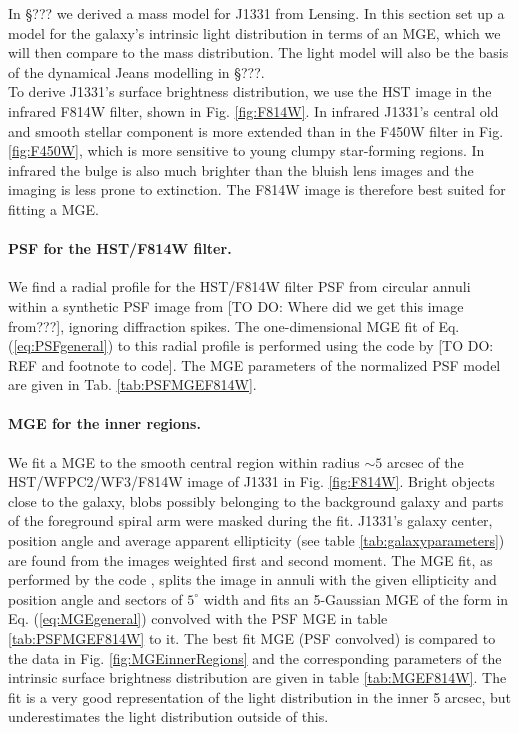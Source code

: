 
In \S ??? we derived a mass model for J1331 from Lensing. In this section set up a model for the galaxy's intrinsic light distribution in terms of an MGE, which we will then compare to the mass distribution. The light model will also be the basis of the dynamical Jeans modelling in \S ???.
\\To derive J1331's surface brightness distribution, we use the HST image in the infrared F814W filter, shown in Fig. \ref{fig:F814W}. In infrared J1331's central old and smooth stellar component is more extended than in the F450W filter in Fig. \ref{fig:F450W}, which is more sensitive to young clumpy star-forming regions. In infrared the bulge is also much brighter than the bluish lens images and the imaging is less prone to extinction. The F814W image is therefore best suited for fitting a MGE. 

\paragraph{PSF for the HST/F814W filter.} We find a radial profile for the HST/F814W filter PSF from circular annuli within a synthetic PSF image from [TO DO: Where did we get this image from???], ignoring diffraction spikes. The one-dimensional MGE fit of Eq. (\ref{eq:PSFgeneral}) to this radial profile is performed using the code by [TO DO: REF and footnote to code]. The MGE parameters of the normalized PSF model are given in Tab. \ref{tab:PSFMGEF814W}.

\paragraph{MGE for the inner regions.} We fit a MGE to the smooth central region within radius $\sim 5$ arcsec of the HST/WFPC2/WF3/F814W image of J1331 in Fig. \ref{fig:F814W}. Bright objects  close to the galaxy, blobs possibly belonging to the background galaxy and parts of the foreground spiral arm were masked during the fit. J1331's galaxy center, position angle and average apparent ellipticity (see table \ref{tab:galaxyparameters}) are found from the images weighted first and second moment. The MGE fit, as performed by the code \cite{Cap02}, splits the image in annuli with the given ellipticity and position angle and sectors of $5^\circ$ width and fits an 5-Gaussian MGE of the form in Eq. (\ref{eq:MGEgeneral}) convolved with the PSF MGE in table \ref{tab:PSFMGEF814W} to it. The best fit MGE (PSF convolved) is compared to the data in Fig. \ref{fig:MGEinnerRegions} and the corresponding parameters of the intrinsic surface brightness distribution are given in table \ref{tab:MGEF814W}. The fit is a very good representation of the light distribution in the inner 5 arcsec, but underestimates the light distribution outside of this.

